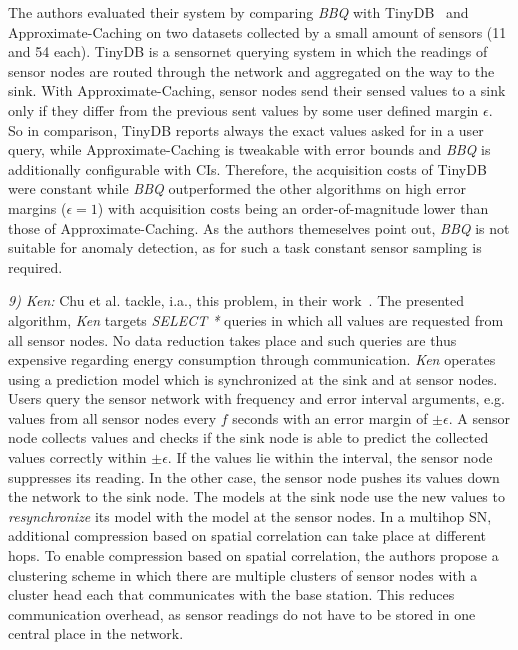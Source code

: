 The authors evaluated their system by comparing \textit{BBQ} with
TinyDB~\cite{madden2005tinydb} and Approximate-Caching on two datasets
collected by a small amount of sensors (11 and 54 each). TinyDB is a sensornet
querying system in which the readings of sensor nodes are routed through the
network and aggregated on the way to the sink. With Approximate-Caching, sensor
nodes send their sensed values to a sink only if they differ from the previous
sent values by some user defined margin $ \epsilon $. So in comparison, TinyDB
reports always the exact values asked for in a user query, while
Approximate-Caching is tweakable with error bounds and \textit{BBQ} is
additionally configurable with \acp{CI}. Therefore, the acquisition costs of
TinyDB were constant while \textit{BBQ} outperformed the other algorithms on
high error margins ($ \epsilon = 1 $) with acquisition costs being an
order-of-magnitude lower than those of Approximate-Caching. As the authors
themeselves point out, \textit{BBQ} is not suitable for anomaly detection, as
for such a task constant sensor sampling is required.
\par
\textit{9) Ken:}
Chu et al. tackle, i.a., this problem, in their work~\cite{chu2006approximate}.
The presented algorithm, \textit{Ken} targets \textit{SELECT *} queries in
which all values are requested from all sensor nodes. No data reduction takes
place and such queries are thus expensive regarding energy consumption through
communication. \textit{Ken} operates using a prediction model which is
synchronized at the sink and at sensor nodes. Users query the sensor network
with frequency and error interval arguments, e.g. values from all sensor nodes
every $ f $ seconds with an error margin of $ \pm\epsilon $. A sensor node
collects values and checks if the sink node is able to predict the collected
values correctly within $ \pm\epsilon $. If the values lie within the interval,
the sensor node suppresses its reading. In the other case, the sensor node
pushes its values down the network to the sink node. The models at the sink
node use the new values to \textit{resynchronize} its model with the model at
the sensor nodes. In a multihop \ac{SN}, additional compression based on
spatial correlation can take place at different hops. To enable compression
based on spatial correlation, the authors propose a clustering scheme in which
there are multiple clusters of sensor nodes with a cluster head each that
communicates with the base station. This reduces communication overhead, as
sensor readings do not have to be stored in one central place in the network.
